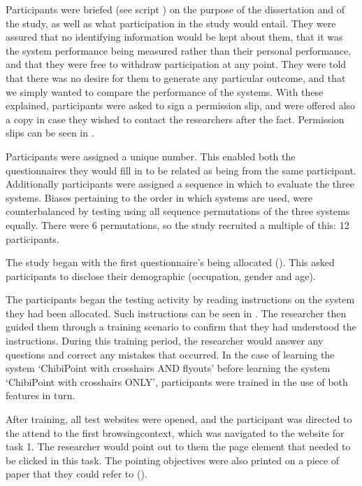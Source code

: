 \documentclass[11pt,openright,a4paper]{report}
\begin{document}
Participants were briefed (see script ) on the purpose of the dissertation and of the study, as well as what participation in the study would entail. They were assured that no identifying information would be kept about them, that it was the system performance being measured rather than their personal performance, and that they were free to withdraw participation at any point. They were told that there was no desire for them to generate any particular outcome, and that we simply wanted to compare the performance of the systems. With these explained, participants were asked to sign a permission slip, and were offered also a copy in case they wished to contact the researchers after the fact. Permission slips can be seen in .

Participants were assigned a unique number. This enabled both the questionnaires they would fill in to be related as being from the same participant. Additionally participants were assigned a sequence in which to evaluate the three systems. Biases pertaining to the order in which systems are used, were counterbalanced by testing using all sequence permutations of the three systems equally. There were 6 permutations, so the study recruited a multiple of this: 12 participants.

The study began with the first questionnaire's being allocated (). This asked participants to disclose their demographic (occupation, gender and age).

The participants began the testing activity by reading instructions on the system they had been allocated. Such instructions can be seen in . The researcher then guided them through a training scenario to confirm that they had understood the instructions. During this training period, the researcher would answer any questions and correct any mistakes that occurred. In the case of learning the system `ChibiPoint with crosshairs AND flyouts' before learning the system `ChibiPoint with crosshairs ONLY', participants were trained in the use of both features in turn.

After training, all test websites were opened, and the participant was directed to the attend to the first \gls{browsingcontext}, which was navigated to the website for task 1. The researcher would point out to them the page element that needed to be clicked in this task. The pointing objectives were also printed on a piece of paper that they could refer to ().
\end{document}
